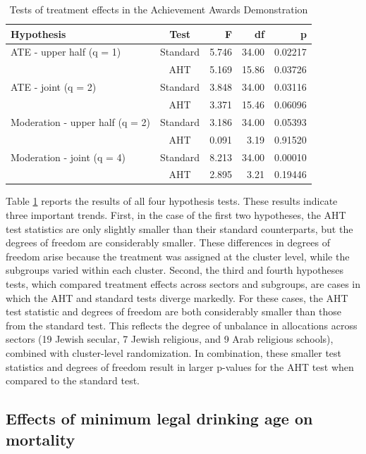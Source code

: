 \documentclass[draft]{ectaart}\usepackage[]{graphicx}\usepackage[]{color}
\begin{document}
\begin{table}[bth]
\centering
\caption{Tests of treatment effects in the Achievement Awards Demonstration} 
\label{tab:AAD}
\begin{tabular}{lcrrr}
  \toprule
Hypothesis & Test & F & df & p \\ 
  \midrule
ATE - upper half (q = 1) & Standard & 5.746 & 34.00 & 0.02217 \\ 
   & AHT & 5.169 & 15.86 & 0.03726 \\ 
  ATE - joint (q = 2) & Standard & 3.848 & 34.00 & 0.03116 \\ 
   & AHT & 3.371 & 15.46 & 0.06096 \\ 
   \midrule
Moderation - upper half (q = 2) & Standard & 3.186 & 34.00 & 0.05393 \\ 
   & AHT & 0.091 & 3.19 & 0.91520 \\ 
  Moderation - joint (q = 4) & Standard & 8.213 & 34.00 & 0.00010 \\ 
   & AHT & 2.895 & 3.21 & 0.19446 \\ 
   \bottomrule
\end{tabular}
\end{table}


Table \ref{tab:AAD} reports the results of all four hypothesis tests. 
These results indicate three important trends.
First, in the case of the first two hypotheses, the AHT test statistics are only slightly smaller than their standard counterparts, but the degrees of freedom are considerably smaller. 
These differences in degrees of freedom arise because the treatment was assigned at the cluster level, while the subgroups varied within each cluster. 
Second, the third and fourth hypotheses tests, which compared treatment effects across sectors and subgroups, are cases in which the AHT and standard tests diverge markedly.
For these cases, the AHT test statistic and degrees of freedom are both considerably smaller than those from the standard test. 
This reflects the degree of unbalance in allocations across sectors (19 Jewish secular, 7 Jewish religious, and 9 Arab religious schools), combined with cluster-level randomization. 
In combination, these smaller test statistics and degrees of freedom result in larger p-values for the AHT test when compared to the standard test.

\subsection{Effects of minimum legal drinking age on mortality} 
\end{document}

